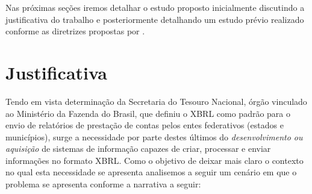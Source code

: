 \documentclass{article}
\begin{document}
Nas próximas seções iremos detalhar o estudo proposto
inicialmente discutindo a justificativa do trabalho  e posteriormente
detalhando um estudo prévio realizado conforme as diretrizes propostas
por \cite{kitchenham2009systematic}.
\section{Justificativa}
\label{sec:contexto}

Tendo em vista determinação da Secretaria do Tesouro Nacional, órgão
vinculado ao  Ministério da Fazenda do Brasil, que definiu o XBRL como
padrão para o envio de relatórios de prestação de contas pelos entes
federativos (estados e municípios), surge a necessidade por parte
destes últimos do \textit{desenvolvimento ou aquisição} de sistemas de
informação capazes de criar, processar e enviar informações no formato
XBRL. Como o objetivo de deixar mais claro o contexto no qual esta
necessidade se apresenta analisemos a seguir um cenário em que o
problema se apresenta conforme a narrativa a seguir:
\\
\\
\end{document}
